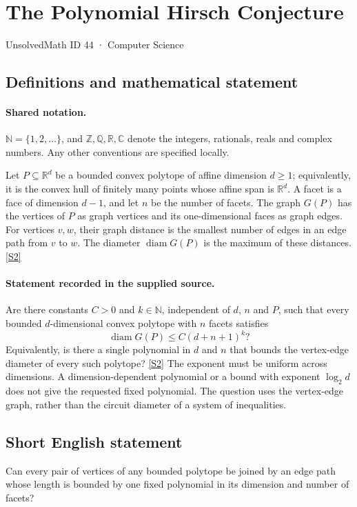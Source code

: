 \documentclass[11pt]{article}
\newcommand{\sref}[2]{\hyperlink{source:#1:#2}{[S#2]}}
\begin{document}
\setcounter{section}{43}
\section{The Polynomial Hirsch Conjecture}\label{44}
{\small\sffamily UnsolvedMath ID 44 · Computer Science}
\subsection{Definitions and mathematical statement}

\paragraph{Shared notation.}$\mathbb N=\{1,2,\ldots\}$, and $\mathbb Z,\mathbb Q,\mathbb R,\mathbb C$ denote the integers, rationals, reals and complex numbers. Any other conventions are specified locally.


Let $P\subseteq\mathbb R^d$ be a bounded convex polytope of affine dimension $d\ge1$; equivalently, it is the convex hull of finitely many points whose affine span is $\mathbb R^d$. A facet is a face of dimension $d-1$, and let $n$ be the number of facets. The graph $G(P)$ has the vertices of $P$ as graph vertices and its one-dimensional faces as graph edges. For vertices $v,w$, their graph distance is the smallest number of edges in an edge path from $v$ to $w$. The diameter $\operatorname{diam}G(P)$ is the maximum of these distances. \sref{44}{2}
\paragraph{Statement recorded in the supplied source.}
Are there constants $C>0$ and $k\in\mathbb N$, independent of $d$, $n$ and $P$, such that every bounded $d$-dimensional convex polytope with $n$ facets satisfies
\[
 \operatorname{diam}G(P)\le C(d+n+1)^k?
\]
Equivalently, is there a single polynomial in $d$ and $n$ that bounds the vertex-edge diameter of every such polytope? \sref{44}{2}
The exponent must be uniform across dimensions. A dimension-dependent polynomial or a bound with exponent $\log_2 d$ does not give the requested fixed polynomial. The question uses the vertex-edge graph, rather than the circuit diameter of a system of inequalities.
\subsection{Short English statement}
Can every pair of vertices of any bounded polytope be joined by an edge path whose length is bounded by one fixed polynomial in its dimension and number of facets?
\end{document}
